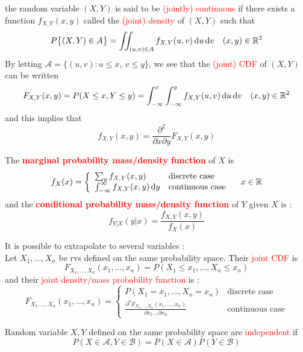 \documentclass[12pt,a4paper]{article}
\begin{document}
 the random variable $(X,Y)$ is said to be \textcolor{red}{(jointly) continuous} if there exists a function $f_{X,Y}(x,y)$ called the \textcolor{red}{(joint) density} of $(X,Y)$ such that 
\[P\big\{(X,Y) \in A\big\} = \iint_{(u,v) \in A} f_{X,Y}(u,v) \, \mathrm d u\, \mathrm d v\quad (x,y) \in \mathbb{R}^2\]
By letting $\mathcal{A} = \big\{(u,v) : u \leq x,\ v \leq y\big\}$, we see that the \textcolor{red}{(joint) CDF} of $(X,Y)$ can be written 
\[F_{X,Y}(x,y) = P(X \leq x, Y \leq y) = \int_{-\infty}^{x}\int_{-\infty}^{y}f_{X,Y}(u,v) \, \mathrm d u\, \mathrm d v \quad (x,y) \in \mathbb{R}^2\]
and this implies that 
\begin{equation}
    f_{X,Y}(x,y) = \frac{\partial^2}{\partial x \partial y}F_{X,Y}(x,y)
\end{equation}

 The \textbf{\textcolor{red}{marginal probability mass/density function}} of $X$ is 
\[f_X(x) = \left\{
    \begin{array}{ll}
        \sum_y f_{X,Y}(x,y) & \text{discrete case}\\
        \int_{-\infty}^{\infty} f_{X,Y}(x,y) \, \mathrm d y & \text{continuous case}
    \end{array}\right. \quad x \in \mathbb{R}\]
and the \textbf{\textcolor{red}{conditional probability mass/density function}} of $Y$ given $X$ is :
\begin{equation}
    f_{Y|X}(y|x) = \frac{f_{X,Y}(x,y)}{f_X(x)}
\end{equation}

It is possible to extrapolate to several variables :\\
 Let $X_1,\ldots,X_n$ be rvs defined on the same probability space. Their \textcolor{red}{joint CDF} is 
\[F_{X_1,\ldots,X_n}(x_1,\ldots,x_n) = P(X_1 \leq x_1,\ldots,X_n \leq x_n)\]
and their \textcolor{red}{joint density/mass probability function} is :
\[F_{X_1,\ldots,X_n}(x_1,\ldots,x_n) = \left\{\begin{array}{ll}
    P(X_1=x_1,\ldots, X_n = x_n) & \text{discrete case}\\
    \frac{\partial^n F_{X_1,\ldots,X_n}(x_1,\ldots,x_n)}{\partial x_1\ldots \partial x_n} & \text{continuous case}
\end{array}
\right.\]

 Random variable $X,Y$ defined on the same probability space are \textcolor{red}{independent} if 
\[P(X \in \mathcal{A}, Y \in \mathcal{B}) = P(X \in \mathcal{A})P(Y \in \mathcal{B})\]
\end{document}
